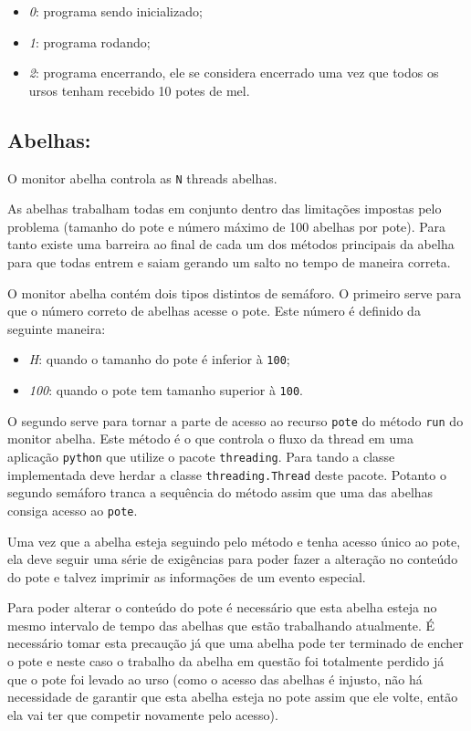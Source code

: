 \documentclass[12pt,a4paper]{article}
\begin{document}
\begin{itemize}
\item \emph{0}: programa sendo inicializado;
\item \emph{1}: programa rodando;
\item \emph{2}: programa encerrando, ele se considera encerrado uma vez que todos os ursos tenham recebido 10 potes de mel.
\end{itemize}

\subsection{Abelhas:}

O monitor abelha controla as \verb+N+ threads abelhas.

As abelhas trabalham todas em conjunto dentro das limitações impostas pelo problema (tamanho do pote e número máximo de 100 abelhas por pote). Para tanto existe uma barreira ao final de cada um dos métodos principais da abelha para que todas entrem e saiam gerando um salto no tempo de maneira correta.

O monitor abelha contém dois tipos distintos de semáforo. O primeiro serve para que o número correto de abelhas acesse o pote. Este número é definido da seguinte maneira:

\begin{itemize}
\item \emph{H}: quando o tamanho do pote é inferior à \verb+100+;
\item \emph{100}: quando o pote tem tamanho superior à \verb+100+.
\end{itemize}

O segundo serve para tornar a parte de acesso ao recurso \verb+pote+ do método \verb+run+ do monitor abelha. Este método é o que controla o fluxo da thread em uma aplicação \verb+python+ que utilize o pacote \verb+threading+. Para tando a classe implementada deve herdar a classe \verb+threading.Thread+ deste pacote. Potanto o segundo semáforo tranca a sequência do método assim que uma das abelhas consiga acesso ao \verb+pote+.

Uma vez que a abelha esteja seguindo pelo método e tenha acesso único ao pote, ela deve seguir uma série de exigências para poder fazer a alteração no conteúdo do pote e talvez imprimir as informações de um evento especial.

Para poder alterar o conteúdo do pote é necessário que esta abelha esteja no mesmo intervalo de tempo das abelhas que estão trabalhando atualmente. É necessário tomar esta precaução já que uma abelha pode ter terminado de encher o pote e neste caso o trabalho da abelha em questão foi totalmente perdido já que o pote foi levado ao urso (como o acesso das abelhas é injusto, não há necessidade de garantir que esta abelha esteja no pote assim que ele volte, então ela vai ter que competir novamente pelo acesso).
\end{document}
